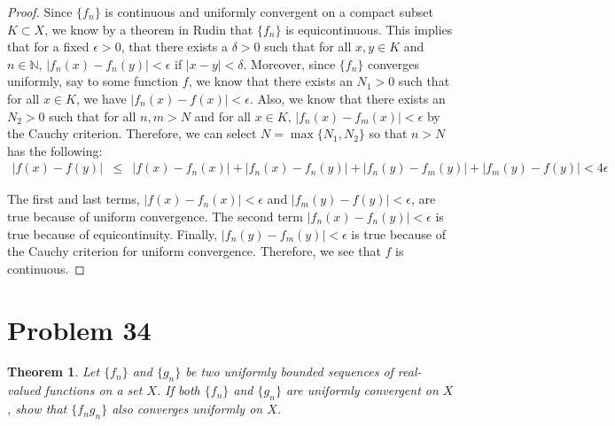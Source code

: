 \documentclass[psamsfonts]{amsart}
\newtheorem{thm}{Theorem}[section]
\theoremstyle{definition}
\theoremstyle{remark}
\numberwithin{equation}{section}
\begin{document}
\begin{proof}
Since $\{ f_n \}$ is continuous and uniformly convergent on a compact subset $K \subset X$, we know by a theorem in Rudin that $\{ f_n \}$ is equicontinuous. This implies that for a fixed $\epsilon > 0$, that there exists a $\delta > 0$ such that for all $x,y \in K$ and $n \in \mathbb{N}$, $ |f_n(x) - f_n(y) | < \epsilon$ if $|x - y| < \delta$. Moreover, since $\{ f_n \}$ converges uniformly, say to some function $f$, we know that there exists an $N_1 > 0$ such that for all $x \in K$, we have $| f_n(x) - f(x) | < \epsilon$. Also, we know that there exists an $N_2 > 0$ such that for all $n,m > N$ and for all $x \in K$, $|f_n(x) - f_m(x) | < \epsilon$ by the Cauchy criterion. Therefore, we can select $N = \max \{ N_1, N_2 \}$ so that $n > N$ has the following:
\begin{eqnarray}
|f(x) - f(y)| &\leq& |f(x) - f_n(x)| + |f_n(x) - f_n(y)| + |f_n(y) - f_m(y)| + |f_m(y) - f(y)| < 4 \epsilon
\end{eqnarray}

The first and last terms, $|f(x) - f_n(x)| < \epsilon$ and $|f_m(y) - f(y)| < \epsilon$, are true because of uniform convergence. The second term $|f_n(x) - f_n(y)| < \epsilon$ is true because of equicontinuity. Finally, $|f_n(y) - f_m(y)| < \epsilon$ is true because of the Cauchy criterion for uniform convergence. Therefore, we see that $f$ is continuous.
\end{proof}

\section{Problem 34}

\begin{thm}
Let $\{ f_n \}$ and $\{ g_n \}$ be two uniformly bounded sequences of real-valued functions on a set $X$. If both $\{ f_n \}$ and $\{ g_n \}$ are uniformly convergent on $X$, show that $\{ f_n g_n \}$ also converges uniformly on $X$.
\end{thm}
\end{document}

